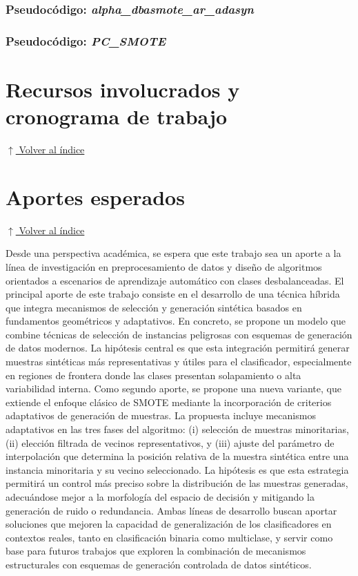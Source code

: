 \documentclass[12pt,a4paper]{article}
\begin{document}
\subsubsection{Pseudocódigo: \textit{alpha\_dbasmote\_ar\_adasyn}}


\subsubsection{Pseudocódigo: \textit{PC\_SMOTE}}







\section{Recursos involucrados y cronograma de trabajo} \noindent\hyperlink{toc}{\small$\uparrow$ Volver al índice}

\section{Aportes esperados} \noindent\hyperlink{toc}{\small$\uparrow$ Volver al índice}

Desde una perspectiva académica, se espera que este trabajo sea un aporte a la línea de investigación en preprocesamiento de datos y diseño de algoritmos orientados a escenarios de aprendizaje automático con clases desbalanceadas. 
El principal aporte de este trabajo consiste en el desarrollo de una técnica híbrida que integra mecanismos de selección y generación sintética basados en fundamentos geométricos y adaptativos. En concreto, se propone un modelo que combine técnicas de selección de instancias peligrosas con esquemas de generación de datos modernos. La hipótesis central es que esta integración permitirá generar muestras sintéticas más representativas y útiles para el clasificador, especialmente en regiones de frontera donde las clases presentan solapamiento o alta variabilidad interna.
Como segundo aporte, se propone una nueva variante, que extiende el enfoque clásico de SMOTE mediante la incorporación de criterios adaptativos de generación de muestras. La propuesta incluye mecanismos adaptativos en las tres fases del algoritmo: (i) selección de muestras minoritarias, (ii) elección filtrada de vecinos representativos, y (iii) ajuste del parámetro de interpolación que determina la posición relativa de la muestra sintética entre una instancia minoritaria y su vecino seleccionado. La hipótesis es que esta estrategia permitirá un control más preciso sobre la distribución de las muestras generadas, adecuándose mejor a la morfología del espacio de decisión y mitigando la generación de ruido o redundancia.
Ambas líneas de desarrollo buscan aportar soluciones que mejoren la capacidad de generalización de los clasificadores en contextos reales, tanto en clasificación binaria como multiclase, y servir como base para futuros trabajos que exploren la combinación de mecanismos estructurales con esquemas de generación controlada de datos sintéticos.
\end{document}
